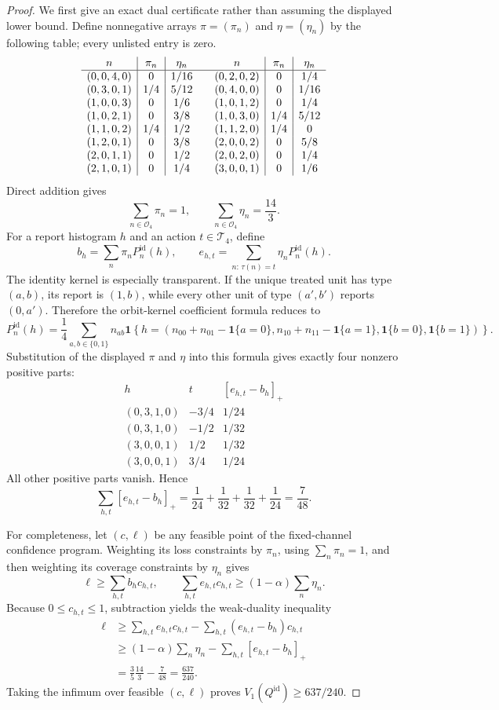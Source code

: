 \documentclass{article}
\begin{document}
\begin{proof}
We first give an exact dual certificate rather than assuming the displayed lower bound. Define nonnegative arrays \(\pi=(\pi_n)\) and \(\eta=(\eta_n)\) by the following table; every unlisted entry is zero.
\[
\begin{array}{c|c|c@{\qquad}c|c|c}
n&\pi_n&\eta_n&n&\pi_n&\eta_n\\ \hline
(0,0,4,0)&0&1/16 &(0,2,0,2)&0&1/4\\
(0,3,0,1)&1/4&5/12 &(0,4,0,0)&0&1/16\\
(1,0,0,3)&0&1/6 &(1,0,1,2)&0&1/4\\
(1,0,2,1)&0&3/8 &(1,0,3,0)&1/4&5/12\\
(1,1,0,2)&1/4&1/2 &(1,1,2,0)&1/4&0\\
(1,2,0,1)&0&3/8 &(2,0,0,2)&0&5/8\\
(2,0,1,1)&0&1/2 &(2,0,2,0)&0&1/4\\
(2,1,0,1)&0&1/4 &(3,0,0,1)&0&1/6
\end{array}
\]
Direct addition gives
\[
 \sum_{n\in\mathcal O_4}\pi_n=1,
 \qquad
 \sum_{n\in\mathcal O_4}\eta_n=\frac{14}{3}.
\]
For a report histogram \(h\) and an action \(t\in\mathcal T_4\), define
\[
 b_h=\sum_n\pi_nP^{\mathrm{id}}_n(h),
 \qquad
 e_{h,t}=\sum_{n:\,\tau(n)=t}\eta_nP^{\mathrm{id}}_n(h).
\]
The identity kernel is especially transparent. If the unique treated unit has type \((a,b)\), its report is \((1,b)\), while every other unit of type \((a',b')\) reports \((0,a')\). Therefore the orbit-kernel coefficient formula reduces to
\[
 P^{\mathrm{id}}_n(h)
 =\frac14\sum_{a,b\in\{0,1\}}n_{ab}
 \mathbf 1\!\left\{
 h=\left(
 n_{00}+n_{01}-\mathbf 1\{a=0\},
 n_{10}+n_{11}-\mathbf 1\{a=1\},
 \mathbf 1\{b=0\},
 \mathbf 1\{b=1\}
 \right)\right\}.
\]
Substitution of the displayed \(\pi\) and \(\eta\) into this formula gives exactly four nonzero positive parts:
\[
\begin{array}{c|c|c}
h&t&[e_{h,t}-b_h]_+\\ \hline
(0,3,1,0)&-3/4&1/24\\
(0,3,1,0)&-1/2&1/32\\
(3,0,0,1)& 1/2&1/32\\
(3,0,0,1)& 3/4&1/24
\end{array}
\]
All other positive parts vanish. Hence
\[
 \sum_{h,t}[e_{h,t}-b_h]_+
 =\frac1{24}+\frac1{32}+\frac1{32}+\frac1{24}
 =\frac7{48}.
\]

For completeness, let \((c,\ell)\) be any feasible point of the fixed-channel confidence program. Weighting its loss constraints by \(\pi_n\), using \(\sum_n\pi_n=1\), and then weighting its coverage constraints by \(\eta_n\) gives
\[
 \ell\ge \sum_{h,t}b_hc_{h,t},
 \qquad
 \sum_{h,t}e_{h,t}c_{h,t}
 \ge (1-\alpha)\sum_n\eta_n.
\]
Because \(0\le c_{h,t}\le1\), subtraction yields the weak-duality inequality
\[
\begin{aligned}
 \ell
 &\ge \sum_{h,t}e_{h,t}c_{h,t}
      -\sum_{h,t}(e_{h,t}-b_h)c_{h,t}\\
 &\ge (1-\alpha)\sum_n\eta_n
      -\sum_{h,t}[e_{h,t}-b_h]_+\\
 &=\frac35\frac{14}{3}-\frac7{48}
 =\frac{637}{240}.
\end{aligned}
\]
Taking the infimum over feasible \((c,\ell)\) proves \(V_1(Q^{\mathrm{id}})\ge637/240\).


\end{proof}
\end{document}
